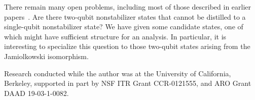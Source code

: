 \documentclass[11pt]{article}
\theoremstyle{note}
\begin{document}
There remain many open problems, including most of those described in earlier papers~\cite{BravyiKitaev04,Reichardt04magic}.  Are there two-qubit nonstabilizer states that cannot be distilled to a single-qubit nonstabilizer state?  We have given some candidate states, one of which might have sufficient structure for an analysis.  In particular, it is interesting to specialize this question to those two-qubit states arising from the Jamiolkowski isomorphism.

\smallskip
Research conducted while the author was at the University of California, Berkeley, supported in part by NSF ITR Grant CCR-0121555, and ARO Grant DAAD 19-03-1-0082.



\end{document}
